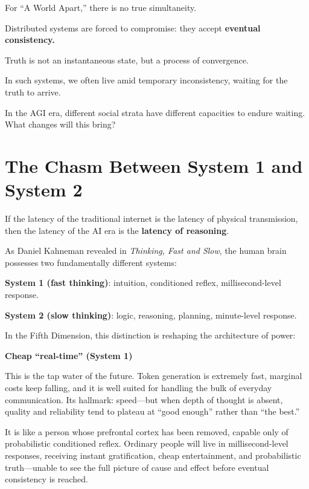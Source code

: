 \vspace{1em}

For ``A World Apart,'' there is no true simultaneity.

Distributed systems are forced to compromise: they accept \textbf{eventual consistency.}

Truth is not an instantaneous state, but a process of convergence.

In such systems, we often live amid temporary inconsistency, waiting for the truth to arrive.

\begin{thinkbox}
In the AGI era, different social strata have different capacities to endure waiting. What changes will this bring?
\end{thinkbox}

\newpage
\section{The Chasm Between System 1 and System 2}

If the latency of the traditional internet is the latency of physical transmission,
then the latency of the AI era is the \textbf{latency of reasoning}.

\vspace{1em}

As Daniel Kahneman revealed in \textit{Thinking, Fast and Slow},
the human brain possesses two fundamentally different systems:

\textbf{System 1 (fast thinking)}: intuition, conditioned reflex, millisecond-level response.

\textbf{System 2 (slow thinking)}: logic, reasoning, planning, minute-level response.

\vspace{1em}

In the Fifth Dimension, this distinction is reshaping the architecture of power:

\textbf{Cheap ``real-time'' (System 1)}

This is the tap water of the future. Token generation is extremely fast, marginal costs keep falling, and it is well suited for handling the bulk of everyday communication. Its hallmark: speed---but when depth of thought is absent, quality and reliability tend to plateau at ``good enough'' rather than ``the best.''

It is like a person whose prefrontal cortex has been removed, capable only of probabilistic conditioned reflex. Ordinary people will live in millisecond-level responses, receiving instant gratification, cheap entertainment, and probabilistic truth---unable to see the full picture of cause and effect before eventual consistency is reached.

